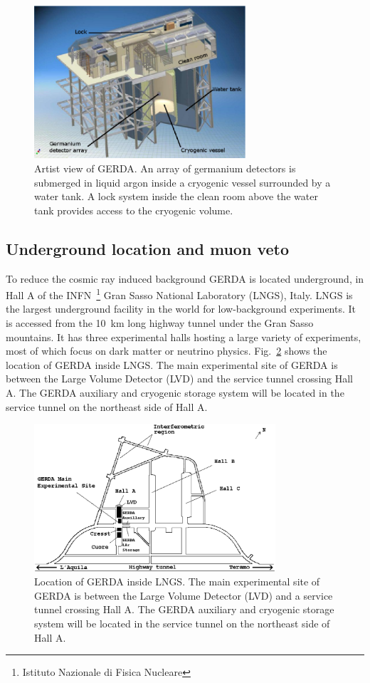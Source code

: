 \begin{figure}[tbhp]
  \centering
  \includegraphics[width=0.7\textwidth]{gerda}
  \caption{Artist view of GERDA. An array of germanium detectors is     submerged in liquid argon inside a cryogenic vessel surrounded by     a water tank. A lock system inside the clean room above the water     tank provides access to the cryogenic volume.}
  \label{fig:gerda}
\end{figure}

\subsection{Underground location and muon veto}
\label{sec:gerda:loca}
To reduce the cosmic ray induced background GERDA is located underground, in Hall A of the INFN~\footnote{Istituto Nazionale di   Fisica Nucleare} Gran Sasso National Laboratory (LNGS), Italy. LNGS is the largest underground facility in the world for low-background experiments. It is accessed from the 10~km long highway tunnel under the Gran Sasso mountains. It has three experimental halls hosting a large variety of experiments, most of which focus on dark matter or neutrino physics. Fig.~\ref{fig:lngs} shows the location of GERDA inside LNGS. The main experimental site of GERDA is between the Large Volume Detector (LVD) and the service tunnel crossing Hall A. The GERDA auxiliary and cryogenic storage system will be located in the service tunnel on the northeast side of Hall A.

\begin{figure}[tbhp]
  \centering
  \includegraphics[width=0.8\textwidth]{lngs}  
  \caption{Location of GERDA inside LNGS. The main experimental site     of GERDA is between the Large Volume Detector (LVD) and a service     tunnel crossing Hall A. The GERDA auxiliary and cryogenic storage     system will be located in the service tunnel on the northeast side     of Hall A.}
  \label{fig:lngs}
\end{figure}

